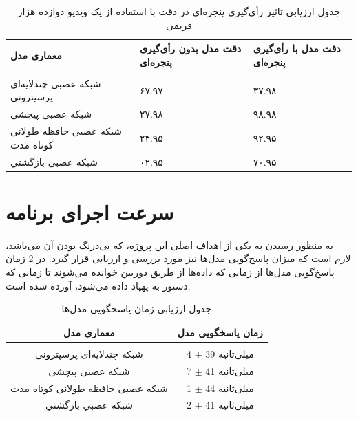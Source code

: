 \begin{table}[h!]
    \centering
    \begin{tabular}{||>{\centering\arraybackslash}p{5.5cm} >{\centering\arraybackslash}p{4cm} >{\centering\arraybackslash}p{4cm}||}
     \hline
     \rule{0pt}{3ex} معماری مدل & دقت مدل بدون رأی‌گیری پنجره‌ای & دقت مدل با رأی‌گیری پنجره‌ای \\ [1.5ex]
     \hline
     \hline
     \rule{0pt}{0.5ex} & & \\  
     شبکه عصبی چندلایه‌ای پرسپترونی & ۶۷.۹۷ \text{\%} & ۳۷.۹۸ \text{\%}\\ [2.5ex]
     شبکه عصبی پیچشی & ۲۷.۹۸ \text{\%} & ۹۸.۹۸ \text{\%} \\ [2.5ex]
     شبکه عصبی حافظه طولانی کوتاه مدت & ۲۴.۹۵ \text{\%} & ۹۲.۹۵ \text{\%} \\ [2.5ex]
     شبکه عصبی بازگشتي & ۰۲.۹۵ \text{\%} & ۷۰.۹۵ \text{\%} \\ [2.5ex]
     \hline
    \end{tabular}
    \caption{جدول ارزیابی تاثیر رأی‌گیری پنجره‌ای در دقت  با استفاده از یک ویدیو دوازده هزار فریمی}
    \centering
    \label{table:window}
\end{table}


\section{سرعت اجرای برنامه}
به منظور رسیدن به یکی از اهداف اصلی این پروژه، که بی‌درنگ بودن آن می‌باشد، لازم است که میزان پاسخ‌گویی مدل‌ها نیز مورد بررسی و ارزیابی قرار گیرد. در 
\cref{table:1}
زمان پاسخ‌گویی مدل‌ها از زمانی که داده‌ها از طریق دوربین خوانده می‌شوند تا زمانی که دستور به پهپاد داده می‌شود، آورده شده است.

\begin{table}[h!]
    \centering
    \begin{tabular}{||c c||}
     \hline
     \rule{0pt}{3ex}معماری مدل & زمان پاسخگویی مدل\\ [1.5ex]
     \hline
     \hline
     \rule{0pt}{0.5ex} & \\  %
     شبکه چندلایه‌ای پرسپترونی & 4 $\pm$ 39 میلی‌ثانیه \\ [2.5ex]
     شبکه عصبی پیچشی & 7 $\pm$ 41 میلی‌ثانیه  \\ [2.5ex]
     شبکه عصبی  حافظه طولانی کوتاه مدت & 1 $\pm$ 44 میلی‌ثانیه  \\ [2.5ex]
     شبكه عصبي بازگشتي & 2 $\pm$ 41 میلی‌ثانیه  \\ [2.5ex]

     \hline
    \end{tabular}
    \caption{جدول ارزیابی زمان پاسخگویی مدل‌ها}
    \label{table:1}
\end{table}


